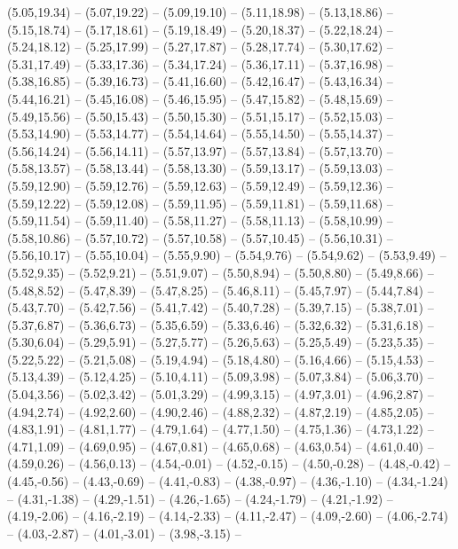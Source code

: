 {  (5.05,19.34) -- (5.07,19.22) -- (5.09,19.10) -- (5.11,18.98) -- (5.13,18.86) -- (5.15,18.74) -- (5.17,18.61) --
  (5.19,18.49) -- (5.20,18.37) -- (5.22,18.24) -- (5.24,18.12) -- (5.25,17.99) -- (5.27,17.87) -- (5.28,17.74) --
  (5.30,17.62) -- (5.31,17.49) -- (5.33,17.36) -- (5.34,17.24) -- (5.36,17.11) -- (5.37,16.98) -- (5.38,16.85) --
  (5.39,16.73) -- (5.41,16.60) -- (5.42,16.47) -- (5.43,16.34) -- (5.44,16.21) -- (5.45,16.08) -- (5.46,15.95) --
  (5.47,15.82) -- (5.48,15.69) -- (5.49,15.56) -- (5.50,15.43) -- (5.50,15.30) -- (5.51,15.17) -- (5.52,15.03) --
  (5.53,14.90) -- (5.53,14.77) -- (5.54,14.64) -- (5.55,14.50) -- (5.55,14.37) -- (5.56,14.24) -- (5.56,14.11) --
  (5.57,13.97) -- (5.57,13.84) -- (5.57,13.70) -- (5.58,13.57) -- (5.58,13.44) -- (5.58,13.30) -- (5.59,13.17) --
  (5.59,13.03) -- (5.59,12.90) -- (5.59,12.76) -- (5.59,12.63) -- (5.59,12.49) -- (5.59,12.36) -- (5.59,12.22) --
  (5.59,12.08) -- (5.59,11.95) -- (5.59,11.81) -- (5.59,11.68) -- (5.59,11.54) -- (5.59,11.40) -- (5.58,11.27) --
  (5.58,11.13) -- (5.58,10.99) -- (5.58,10.86) -- (5.57,10.72) -- (5.57,10.58) -- (5.57,10.45) -- (5.56,10.31) --
  (5.56,10.17) -- (5.55,10.04) -- (5.55,9.90) -- (5.54,9.76) -- (5.54,9.62) -- (5.53,9.49) -- (5.52,9.35) --
  (5.52,9.21) -- (5.51,9.07) -- (5.50,8.94) -- (5.50,8.80) -- (5.49,8.66) -- (5.48,8.52) -- (5.47,8.39) --
  (5.47,8.25) -- (5.46,8.11) -- (5.45,7.97) -- (5.44,7.84) -- (5.43,7.70) -- (5.42,7.56) -- (5.41,7.42) --
  (5.40,7.28) -- (5.39,7.15) -- (5.38,7.01) -- (5.37,6.87) -- (5.36,6.73) -- (5.35,6.59) -- (5.33,6.46) --
  (5.32,6.32) -- (5.31,6.18) -- (5.30,6.04) -- (5.29,5.91) -- (5.27,5.77) -- (5.26,5.63) -- (5.25,5.49) --
  (5.23,5.35) -- (5.22,5.22) -- (5.21,5.08) -- (5.19,4.94) -- (5.18,4.80) -- (5.16,4.66) -- (5.15,4.53) --
  (5.13,4.39) -- (5.12,4.25) -- (5.10,4.11) -- (5.09,3.98) -- (5.07,3.84) -- (5.06,3.70) -- (5.04,3.56) --
  (5.02,3.42) -- (5.01,3.29) -- (4.99,3.15) -- (4.97,3.01) -- (4.96,2.87) -- (4.94,2.74) -- (4.92,2.60) --
  (4.90,2.46) -- (4.88,2.32) -- (4.87,2.19) -- (4.85,2.05) -- (4.83,1.91) -- (4.81,1.77) -- (4.79,1.64) --
  (4.77,1.50) -- (4.75,1.36) -- (4.73,1.22) -- (4.71,1.09) -- (4.69,0.95) -- (4.67,0.81) -- (4.65,0.68) --
  (4.63,0.54) -- (4.61,0.40) -- (4.59,0.26) -- (4.56,0.13) -- (4.54,-0.01) -- (4.52,-0.15) -- (4.50,-0.28) --
  (4.48,-0.42) -- (4.45,-0.56) -- (4.43,-0.69) -- (4.41,-0.83) -- (4.38,-0.97) -- (4.36,-1.10) -- (4.34,-1.24) --
  (4.31,-1.38) -- (4.29,-1.51) -- (4.26,-1.65) -- (4.24,-1.79) -- (4.21,-1.92) -- (4.19,-2.06) -- (4.16,-2.19) --
  (4.14,-2.33) -- (4.11,-2.47) -- (4.09,-2.60) -- (4.06,-2.74) -- (4.03,-2.87) -- (4.01,-3.01) -- (3.98,-3.15) --
}
